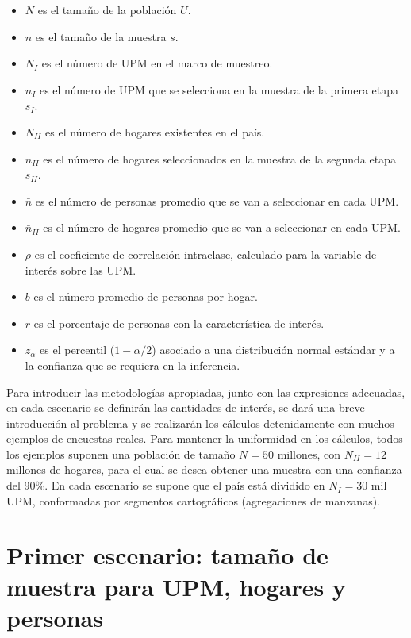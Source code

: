 \documentclass[12pt,spanish,]{book}
\providecommand{\tightlist}{%
  \setlength{\itemsep}{0pt}\setlength{\parskip}{0pt}}
\begin{document}
\begin{itemize}
\tightlist
\item
  \(N\) es el tamaño de la población \(U\).
\item
  \(n\) es el tamaño de la muestra \(s\).
\item
  \(N_{I}\) es el número de UPM en el marco de muestreo.
\item
  \(n_{I}\) es el número de UPM que se selecciona en la muestra de la primera etapa \(s_I\).
\item
  \(N_{II}\) es el número de hogares existentes en el país.
\item
  \(n_{II}\) es el número de hogares seleccionados en la muestra de la segunda etapa \(s_{II}\).
\item
  \(\bar{n}\) es el número de personas promedio que se van a seleccionar en cada UPM.
\item
  \(\bar{n}_{II}\) es el número de hogares promedio que se van a seleccionar en cada UPM.
\item
  \(\rho\) es el coeficiente de correlación intraclase, calculado para la variable de interés sobre las UPM.
\item
  \(b\) es el número promedio de personas por hogar.
\item
  \(r\) es el porcentaje de personas con la característica de interés.
\item
  \(z_{\alpha}\) es el percentil (\(1- \alpha/2\)) asociado a una distribución normal estándar y a la confianza que se requiera en la inferencia.
\end{itemize}

Para introducir las metodologías apropiadas, junto con las expresiones adecuadas, en cada escenario se definirán las cantidades de interés, se dará una breve introducción al problema y se realizarán los cálculos detenidamente con muchos ejemplos de encuestas reales. Para mantener la uniformidad en los cálculos, todos los ejemplos suponen una población de tamaño \(N=50\) millones, con \(N_{II} = 12\) millones de hogares, para el cual se desea obtener una muestra con una confianza del 90\%. En cada escenario se supone que el país está dividido en \(N_{I} =30\) mil UPM, conformadas por segmentos cartográficos (agregaciones de manzanas).

\hypertarget{primer-escenario-tamano-de-muestra-para-upm-hogares-y-personas}{%
\section{Primer escenario: tamaño de muestra para UPM, hogares y personas}\label{primer-escenario-tamano-de-muestra-para-upm-hogares-y-personas}}
\end{document}
